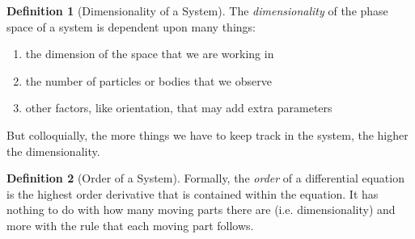 \documentclass{article}
\theoremstyle{remark}
\theoremstyle{definition}
\newtheorem{definition}{Definition}[section]
\begin{document}
\begin{definition}[Dimensionality of a System]
The \textit{dimensionality} of the phase space of a system is dependent upon many things: 
\begin{enumerate}
    \item the dimension of the space that we are working in
    \item the number of particles or bodies that we observe
    \item other factors, like orientation, that may add extra parameters 
\end{enumerate}
But colloquially, the more things we have to keep track in the system, the higher the dimensionality. 
\end{definition}

\begin{definition}[Order of a System]
Formally, the \textit{order} of a differential equation is the highest order derivative that is contained within the equation. It has nothing to do with how many moving parts there are (i.e. dimensionality) and more with the rule that each moving part follows. 
\end{definition}
\end{document}
